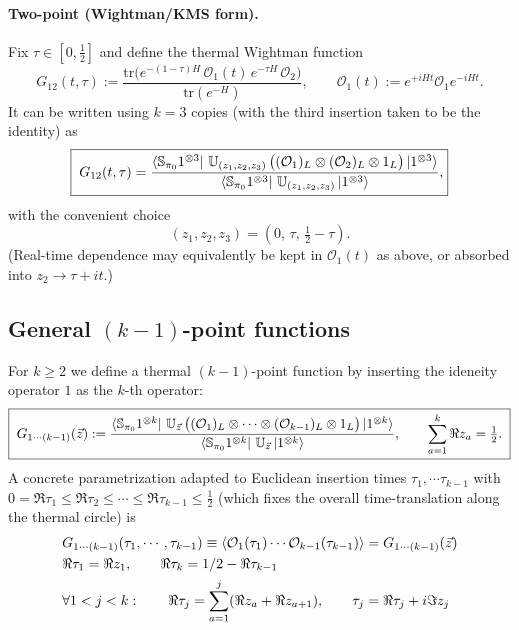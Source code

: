\documentclass{article}
\theoremstyle{definition}
\newcommand{\nn}{\nonumber}
\newcommand{\mO}{\mathcal{O}}
\newcommand{\tr}{\text{tr}}
\begin{document}
    \paragraph{Two-point (Wightman/KMS form).}
    Fix $\tau\in[0,\tfrac12]$ and define the thermal Wightman function
    \begin{equation}
        \label{2ptthermal}G_{12}(t,\tau):=\frac{\tr\big(e^{-(1-\tau)H}\,\mO_{1}(t)\,e^{-\tau
        H}\,\mO_{2}\big)}{\tr(e^{-H})}, \qquad \mO_{1}(t):=e^{+iHt}\mO_{1}e^{-iHt}
        .
    \end{equation}
    It can be written using $k=3$ copies (with the third insertion taken to be the
    identity) as
    \begin{equation}
        \boxed{\; G_{12}(t,\tau) =\frac{\bra{\mathbb{S}_{\pi_0}1^{\otimes 3}}\,\mathbb{U}_{(z_1,z_2,z_3)}\,\big((\mO_{1})_{L}\otimes (\mO_{2})_{L}\otimes 1_{L}\big)\ket{1^{\otimes 3}}}{\bra{\mathbb{S}_{\pi_0}1^{\otimes 3}}\,\mathbb{U}_{(z_1,z_2,z_3)}\ket{1^{\otimes 3}}} ,}
    \end{equation}
    with the convenient choice
    \begin{equation}
        (z_{1},z_{2},z_{3})=(0,\,\tau,\,\tfrac12-\tau).
    \end{equation}
    (Real-time dependence may equivalently be kept in $\mO_{1}(t)$ as above, or
    absorbed into $z_{2}\to \tau+i t$.)

    \subsection*{General $(k\! -\! 1)$-point functions}

    For $k\ge 2$ we define a thermal $(k-1)$-point function by inserting the
    ideneity operator $1$ as the $k$-th operator:
    \begin{equation}
        \boxed{\; G_{1\cdots (k-1)}(\vec z) :=\frac{\bra{\mathbb{S}_{\pi_0}1^{\otimes k}}\,\mathbb{U}_{\vec z}\,\big((\mO_{1})_{L}\otimes\cdots\otimes (\mO_{k-1})_{L}\otimes 1_{L}\big)\ket{1^{\otimes k}}}{\bra{\mathbb{S}_{\pi_0}1^{\otimes k}}\,\mathbb{U}_{\vec z}\ket{1^{\otimes k}}},\qquad \sum_{a=1}^k\Re z_a=\tfrac12.\;}
    \end{equation}
    A concrete parametrization adapted to Euclidean insertion times $\tau_{1},\cdots
    \tau_{k-1}$ with $0=\Re\tau_{1}\le \Re\tau_{2}\le\cdots\le \Re\tau_{k-1}\le \tfrac
    12$ (which fixes the overall time-translation along the thermal circle) is
    \begin{align}
         & G_{1\cdots (k-1)}(\tau_{1},\cdots, \tau_{k-1})\equiv\braket{\mO_1(\tau_1)\cdots \mO_{k-1}(\tau_{k-1})}=G_{1\cdots(k-1)}(\vec{z})\nn \\
         & \Re\tau_{1}=\Re z_{1},\qquad \Re\tau_{k}=1/2-\Re\tau_{k-1}\nn                                                                       \\
         & \forall 1<j<k:\qquad \Re\tau_{j}=\sum_{a=1}^{j}(\Re z_{a}+\Re z_{a+1}),\qquad \tau_{j}=\Re \tau_{j}+i\Im z_{j}
    \end{align}
\end{document}
